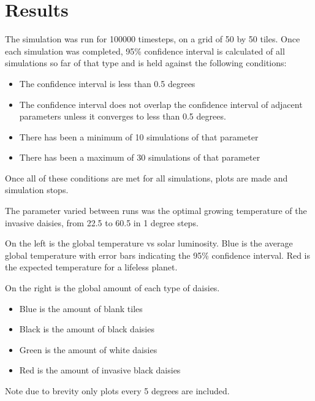 \documentclass[12pt]{article}
\begin{document}
\section{Results}
The simulation was run for 100000 timesteps, on a grid of 50 by 50
tiles. Once each simulation was completed, 95\% confidence interval is
calculated of all simulations so far of that type and is held against
the following conditions:
\begin{itemize}
\item The confidence interval is less than 0.5 degrees
\item The confidence interval does not overlap the confidence interval
  of adjacent parameters unless it converges to less than 0.5 degrees.
\item There has been a minimum of 10 simulations of that parameter
\item There has been a maximum of 30 simulations of that parameter
\end{itemize}

Once all of these conditions are met for all simulations, plots are
made and simulation stops.

The parameter varied between runs was the optimal growing temperature
of the invasive daisies, from 22.5 to 60.5 in 1 degree steps.

On the left is the global temperature vs solar luminosity.
Blue is the average global temperature with error bars indicating the
95\% confidence interval. Red is the expected temperature for a
lifeless planet.

On the right is the global amount of each type of daisies.
\begin{itemize}
\item Blue is the amount of blank tiles
\item Black is the amount of black daisies
\item Green is the amount of white daisies
\item Red is the amount of invasive black daisies
\end{itemize}

Note due to brevity only plots every 5 degrees are included.
\end{document}

